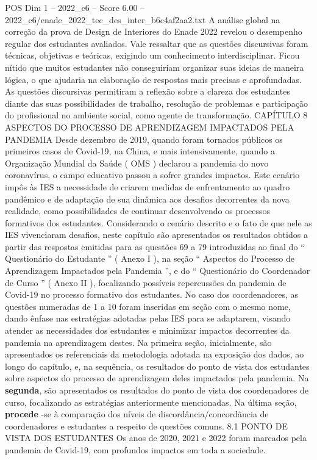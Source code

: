 \begin{textsample}{POS Dim 1 – 2022\_c6 – Score 6.00 – 2022\_c6/enade\_2022\_tec\_des\_inter\_b6c4af2aa2.txt}
A análise global na correção da prova de Design de Interiores do Enade 2022 revelou o desempenho regular dos estudantes avaliados.
Vale ressaltar que as questões discursivas foram técnicas, objetivas e teóricas, exigindo um conhecimento interdisciplinar.
Ficou nítido que muitos estudantes não conseguiriam organizar suas ideias de maneira lógica, o que ajudaria na elaboração de respostas mais precisas e aprofundadas.
As questões discursivas permitiram a reflexão sobre a clareza dos estudantes diante das suas possibilidades de trabalho, resolução de problemas e participação do profissional no ambiente social, como agente de transformação.
CAPÍTULO 8 ASPECTOS DO PROCESSO DE APRENDIZAGEM IMPACTADOS PELA PANDEMIA Desde dezembro de 2019, quando foram tornados públicos os primeiros casos de Covid-19, na China, e mais intensivamente, quando a Organização Mundial da Saúde ( OMS ) declarou a pandemia do novo coronavírus, o campo educativo passou a sofrer grandes impactos.
Este cenário impôs às IES a necessidade de criarem medidas de enfrentamento ao quadro pandêmico e de adaptação de sua dinâmica aos desafios decorrentes da nova realidade, como possibilidades de continuar desenvolvendo os processos formativos dos estudantes.
Considerando o cenário descrito e o fato de que nele as IES vivenciaram desafios, neste capítulo são apresentados os resultados obtidos a partir das respostas emitidas para as questões 69 a 79 introduzidas ao final do “ Questionário do Estudante ” ( Anexo I ), na seção “ Aspectos do Processo de Aprendizagem Impactados pela Pandemia ”, e do “ Questionário do Coordenador de Curso ” ( Anexo II ), focalizando possíveis repercussões da pandemia de Covid-19 no processo formativo dos estudantes.
No caso dos coordenadores, as questões numeradas de 1 a 10 foram inseridas em seção com o mesmo nome, dando ênfase nas estratégias adotadas pelas IES para se adaptarem, visando atender as necessidades dos estudantes e minimizar impactos decorrentes da pandemia na aprendizagem destes.
Na primeira seção, inicialmente, são apresentados os referenciais da metodologia adotada na exposição dos dados, ao longo do capítulo, e, na sequência, os resultados do ponto de vista dos estudantes sobre aspectos do processo de aprendizagem deles impactados pela pandemia.
Na \textbf{segunda}, são apresentados os resultados do ponto de vista dos coordenadores de curso, focalizando as estratégias anteriormente mencionadas.
Na última seção, \textbf{procede} -se à comparação dos níveis de discordância/concordância de coordenadores e estudantes a respeito de questões comuns. 8.1 PONTO DE VISTA DOS ESTUDANTES Os anos de 2020, 2021 e 2022 foram marcados pela pandemia de Covid-19, com profundos impactos em toda a sociedade.

\end{textsample}
